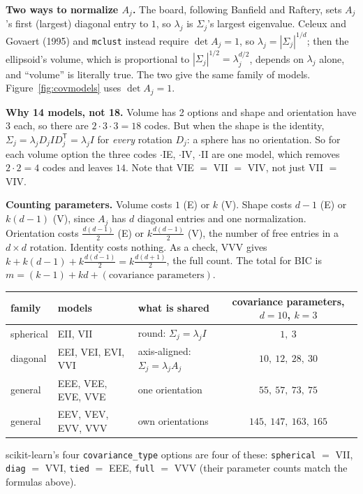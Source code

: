 \documentclass[11pt]{article}
\newcommand{\T}{^{\mathsf T}}
\begin{document}
\begin{careful}
\textbf{Two ways to normalize $A_j$.} The board, following Banfield and Raftery, sets $A_j$'s first (largest) diagonal entry to $1$, so $\lambda_j$ is $\Sigma_j$'s largest eigenvalue. Celeux and Govaert (1995) and \texttt{mclust} instead require $\det A_j=1$, so $\lambda_j=|\Sigma_j|^{1/d}$; then the ellipsoid's volume, which is proportional to $|\Sigma_j|^{1/2}=\lambda_j^{d/2}$, depends on $\lambda_j$ alone, and ``volume'' is literally true. The two give the same family of models. Figure~\ref{fig:covmodels} uses $\det A_j=1$.
\end{careful}

\textbf{Why 14 models, not 18.} Volume has 2 options and shape and orientation have 3 each, so there are $2\cdot3\cdot3=18$ codes. But when the shape is the identity, $\Sigma_j=\lambda_jD_jID_j\T=\lambda_jI$ for \emph{every} rotation $D_j$: a sphere has no orientation. So for each volume option the three codes $\cdot$IE, $\cdot$IV, $\cdot$II are one model, which removes $2\cdot2=4$ codes and leaves $14$. Note that VIE $=$ VII $=$ VIV, not just VII $=$ VIV.

\textbf{Counting parameters.} Volume costs $1$ (E) or $k$ (V). Shape costs $d-1$ (E) or $k(d-1)$ (V), since $A_j$ has $d$ diagonal entries and one normalization. Orientation costs $\frac{d(d-1)}2$ (E) or $k\frac{d(d-1)}2$ (V), the number of free entries in a $d\times d$ rotation. Identity costs nothing. As a check, VVV gives $k+k(d-1)+k\frac{d(d-1)}2=k\frac{d(d+1)}2$, the full count. The total for BIC is $m=(k-1)+kd+(\text{covariance parameters})$.

\begin{center}
\small
\begin{tabular}{@{}lllc@{}}
\toprule
family & models & what is shared & covariance parameters, $d=10$, $k=3$ \\
\midrule
spherical & EII, VII & round: $\Sigma_j=\lambda_jI$ & $1,\ 3$ \\
diagonal & EEI, VEI, EVI, VVI & axis-aligned: $\Sigma_j=\lambda_jA_j$ & $10,\ 12,\ 28,\ 30$ \\
general & EEE, VEE, EVE, VVE & one orientation & $55,\ 57,\ 73,\ 75$ \\
general & EEV, VEV, EVV, VVV & own orientations & $145,\ 147,\ 163,\ 165$ \\
\bottomrule
\end{tabular}
\end{center}
scikit-learn's four \texttt{covariance\_type} options are four of these: \texttt{spherical} $=$ VII, \texttt{diag} $=$ VVI, \texttt{tied} $=$ EEE, \texttt{full} $=$ VVV (their parameter counts match the formulas above).
\end{document}
